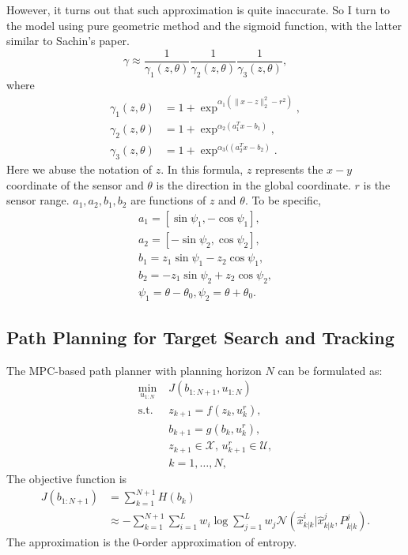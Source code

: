 \documentclass[letterpaper, 10 pt, conference]{ieeeconf}  %
\begin{document}
However, it turns out that such approximation is quite inaccurate. So I turn to the model using pure geometric method and the sigmoid function, with the latter similar to Sachin's paper.
\begin{equation}\label{eqn:gamma}
\gamma\approx \frac{1}{\gamma_1(z,\theta)}\frac{1}{\gamma_2(z,\theta)}\frac{1}{\gamma_3(z,\theta)},
\end{equation}
where \begin{align*}
\gamma_1(z,\theta)&=1+\exp^{\alpha_1(\|x-z\|^2_2-r^2)},\\
\gamma_2(z,\theta)&=1+\exp^{\alpha_2(a^T_1x-b_1)},\\
\gamma_3(z,\theta)&=1+\exp^{\alpha_3((a^T_2x-b_2)}.
\end{align*}
Here we abuse the notation of $z$. 
In this formula, $z$ represents the $x-y$ coordinate of the sensor and $\theta$ is the direction in the global coordinate. 
$r$ is the sensor range. $a_1,a_2,b_1,b_2$ are functions of $z$ and $\theta$. 
To be specific, 
\begin{equation*}
\begin{split}
a_1=[\sin\psi_1,-\cos\psi_1],\\
a_2=[-\sin\psi_2,\cos\psi_2],\\
b_1=z_1\sin\psi_1-z_2\cos\psi_1,\\
b_2=-z_1\sin\psi_2+z_2\cos\psi_2,\\
\psi_1=\theta-\theta_0, \psi_2=\theta+\theta_0.
\end{split}
\end{equation*}

\subsection{Path Planning for Target Search and Tracking}
The MPC-based path planner with planning horizon $N$ can be formulated as:
\begin{subequations}
	\begin{align}
	\min_{u_{1:N}}\; & J(b_{1:N+1},u_{1:N})\\
	\text{s.t. }\; & z_{k+1}=f(z_k,u^r_k),\label{subeqn:rbt_dyn}\\
	& b_{k+1}=g(b_k,u^r_k),\label{subeqn:est_upd}\\
	& z_{k+1}\in\mathcal{X}, \, u^r_{k+1}\in\mathcal{U},\\
	& k=1,\dots,N,
	\end{align}\label{eqn:MPC}
\end{subequations}
The objective function is
\begin{align}
J(b_{1:N+1})&=\sum\limits_{k=1}^{N+1} H(b_k)\\ %
& \approx -\sum\limits_{k=1}^{N+1} \sum\limits_{i=1}^{L}w_i\log  \sum\limits_{j=1}^Lw_j\mathcal{N}(\hat{x}^i_{k|k}|\hat{x}^j_{k|k},P^j_{k|k})\label{eqn:approx_obj}.
\end{align}
The approximation is the $0$-order approximation of entropy.
\end{document}
